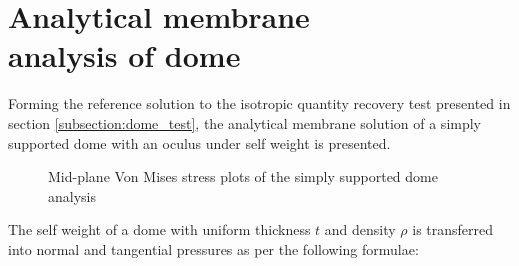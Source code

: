 
\chapter[Analytical membrane analysis of dome]{Analytical membrane\\ analysis of dome}
\label{app:Analytical membrane analysis of dome}

Forming the reference solution to the isotropic quantity recovery test presented in section \ref{subsection:dome_test}, the analytical membrane solution of a simply supported dome with an oculus under self weight is presented.

\begin{figure}[H]
	\caption{\label{App3_dome}Mid-plane Von Mises stress plots of the simply supported dome analysis}
\end{figure}

The self weight of a dome with uniform thickness $t$ and density $\rho$ is transferred into normal and tangential pressures as per the following formulae:

